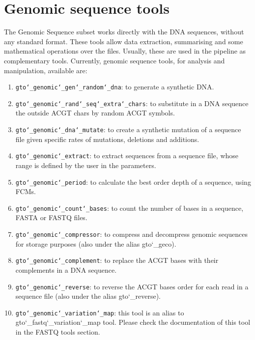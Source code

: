 \chapter{Genomic sequence tools}
\label{gst}
The Genomic Sequence subset works directly with the DNA sequences, without any standard format. These tools allow data extraction, summarising and some mathematical operations over the files. Usually, these are used in the pipeline as complementary tools. Currently, genomic sequence tools, for analysis and manipulation, available are:
\begin{enumerate}

\item \texttt{gto\char`_genomic\char`_gen\char`_random\char`_dna}: to generate a synthetic DNA.

\item \texttt{gto\char`_genomic\char`_rand\char`_seq\char`_extra\char`_chars}: to substitute in a DNA sequence the outside ACGT chars by random ACGT symbols.

\item \texttt{gto\char`_genomic\char`_dna\char`_mutate}: to create a synthetic mutation of a sequence file given specific rates of mutations, deletions and additions.

\item \texttt{gto\char`_genomic\char`_extract}: to extract sequences from a sequence file, whose range is defined by the user in the parameters.

\item \texttt{gto\char`_genomic\char`_period}: to calculate the best order depth of a sequence, using FCMs.

\item \texttt{gto\char`_genomic\char`_count\char`_bases}: to count the number of bases in a sequence, FASTA or FASTQ files.

\item \texttt{gto\char`_genomic\char`_compressor}: to compress and decompress genomic sequences for storage purposes (also under the alias gto\char`_geco).

\item \texttt{gto\char`_genomic\char`_complement}: to replace the ACGT bases with their complements in a DNA sequence.

\item \texttt{gto\char`_genomic\char`_reverse}: to reverse the ACGT bases order for each read in a sequence file (also under the alias gto\char`_reverse).

\item \texttt{gto\char`_genomic\char`_variation\char`_map}: this tool is an alias to gto\char`_fastq\char`_variation\char`_map tool. Please check the documentation of this tool in the FASTQ tools section. 


\end{enumerate}
